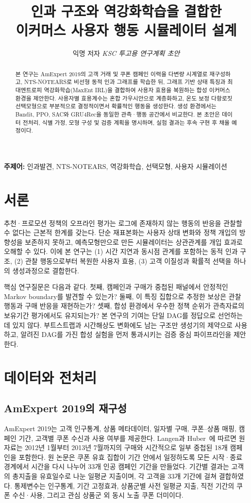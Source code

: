 \documentclass[11pt,twocolumn]{article}
\title{\vspace{-8mm}\textbf{인과 구조와 역강화학습을 결합한\\
이커머스 사용자 행동 시뮬레이터 설계}\vspace{-2mm}}
\author{익명 저자 \quad \textit{KSC 투고용 연구계획 초안}}
\date{}
\begin{document}
\maketitle
\vspace{-6mm}

\begin{abstract}
본 연구는 AmExpert 2019의 고객 거래 및 쿠폰 캠페인 이력을 다변량 시계열로 재구성하고,
NTS-NOTEARS로 비선형 동적 인과 그래프를 학습한 뒤, 그래프 기반 상태 특징과 최대엔트로피
역강화학습(MaxEnt IRL)을 결합하여 사용자 효용을 복원하는 합성 이커머스 환경을 제안한다.
사용자별 효용계수는 혼합 가우시안으로 계층화하고, 온도 보정 다항로짓 선택모형으로
부분적으로 결정적이면서 확률적인 행동을 생성한다. 생성 환경에서는 Bandit, PPO, SAC와
GRU4Rec을 동일한 관측·행동 공간에서 비교한다. 본 초안은 데이터 전처리, 식별 가정,
모형 구성 및 검증 계획을 명시하며, 실험 결과는 후속 구현 후 채울 예정이다.
\end{abstract}
\noindent\textbf{주제어:} 인과발견, NTS-NOTEARS, 역강화학습, 선택모형, 사용자 시뮬레이션

\section{서론}
추천·프로모션 정책의 오프라인 평가는 로그에 존재하지 않는 행동의 반응을 관찰할 수 없다는
근본적 한계를 갖는다. 단순 재표본화는 사용자 상태 변화와 정책 개입의 방향성을 보존하지
못하고, 예측모형만으로 만든 시뮬레이터는 상관관계를 개입 효과로 오해할 수 있다. 이에 본
연구는 (1) 시간 지연과 동시점 관계를 포함하는 동적 인과 구조, (2) 관찰 행동으로부터 복원한
사용자 효용, (3) 고객 이질성과 확률적 선택을 하나의 생성과정으로 결합한다.

핵심 연구질문은 다음과 같다. 첫째, 캠페인과 구매가 중첩된 패널에서 안정적인 Markov
boundary를 발견할 수 있는가? 둘째, 이 특징 집합으로 추정한 보상은 관찰 행동과 구매 반응을
재현하는가? 셋째, 합성 환경에서 우수한 정책 순위가 관측자료의 보유기간 평가에서도 유지되는가?
본 연구의 기여는 단일 DAG를 정답으로 선언하는 데 있지 않다. 부트스트랩과 시간해상도 변화에도
남는 구조만 생성기의 제약으로 사용하고, 알려진 DAG를 가진 합성 실험을 먼저 통과시키는
검증 중심 파이프라인을 제안한다.

\section{데이터와 전처리}
\subsection{AmExpert 2019의 재구성}
AmExpert 2019는 고객 인구통계, 상품 메타데이터, 일자별 구매, 쿠폰--상품 매핑, 캠페인 기간,
고객별 쿠폰 수신과 사용 여부를 제공한다. Langen과 Huber~\cite{langen2023}에 따르면 원자료는
2012년 1월부터 2013년 7월까지의 구매와 시간적으로 일부 중첩된 18개 캠페인을 포함한다.
원 논문은 쿠폰 유효 집합이 기간 안에서 일정하도록 모든 시작·종료 경계에서 시간을 다시 나누어
33개 인공 캠페인 기간을 만들었다. 기간별 결과는 고객의 총지출을 유효일수로 나눈 일평균 지출이며,
각 고객을 33개 기간에 걸쳐 결합하였다. 통제변수는 인구통계, 기간 고정효과, 상품군별 사전
일평균 지출, 직전 기간의 쿠폰 수신·사용, 그리고 관심 상품군 외 동시 노출 쿠폰 더미이다.
\end{document}
